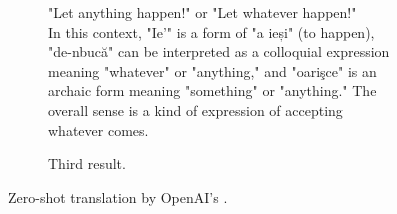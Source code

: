 \documentclass{article}
\begin{document}
\begin{figure*}[h!]
\begin{subfigure}{\textwidth}
\begin{tcolorbox}[colframe=black!10!white, colback=black!5!white]
\begin{minipage}{\textwidth}
                "Let anything happen!" or "Let whatever happen!" \\

                In this context, "Ie'" is a form of "a ieși" (to happen), "de-nbucă" can be interpreted as a colloquial expression meaning "whatever" or "anything," and "oarişce" is an archaic form meaning "something" or "anything." The overall sense is a kind of expression of accepting whatever comes.
            \end{minipage}
        \end{tcolorbox}
        \vspace{-0.5\baselineskip}
        \caption{Third result.}
        \vspace{0.5\baselineskip}
    \end{subfigure}
    \caption{Zero-shot translation by OpenAI's .}
    \label{E5:zero-shot}
\end{figure*}
\end{document}
